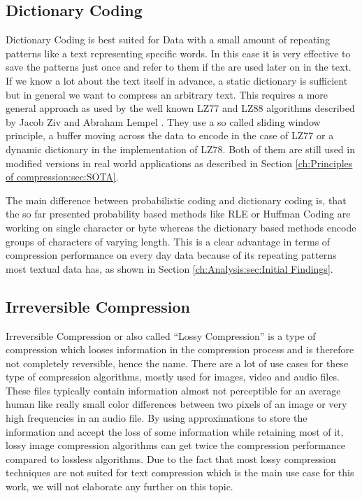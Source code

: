 \subsection{Dictionary Coding}

\par{
Dictionary Coding is best suited for Data with a small amount of repeating patterns like a text representing specific words. In this case it is very effective to save the patterns just once and refer to them if the are used later on in the text. If we know a lot about the text itself in advance, a static dictionary is sufficient but in general we want to compress an arbitrary text. This requires a more general approach as used by the well known LZ77 and LZ88 algorithms described by Jacob Ziv and Abraham Lempel \cite{lz}. They use a so called sliding window principle, a buffer moving across the data to encode in the case of LZ77 or a dynamic dictionary in the implementation of LZ78. Both of them are still used in modified versions in real world applications as described in Section \ref{ch:Principles of compression:sec:SOTA}.
}
\par{
The main difference between probabilistic coding and dictionary coding is, that the so far presented probability based methods like RLE or Huffman Coding are working on single character or byte whereas the dictionary based methods encode groups of characters of varying length. This is a clear advantage in terms of compression performance on every day data because of its repeating patterns most textual data has, as shown in Section \ref{ch:Analysis:sec:Initial Findings}.
}


\subsection{Irreversible Compression}
\par{
Irreversible Compression or also called \enquote{Lossy Compression} is a type of compression which looses information in the compression process and is therefore not completely reversible, hence the name. There are a lot of use cases for these type of compression algorithms, mostly used for images, video and audio files. These files typically contain information almost not perceptible for an average human like really small color differences between two pixels of an image or very high frequencies in an audio file. By using approximations to store the information and accept the loss of some information while retaining most of it, lossy image compression algorithms can get twice the compression performance compared to lossless algorithms. Due to the fact that most lossy compression techniques are not suited for text compression which is the main use case for this work, we will not elaborate any further on this topic.
}


